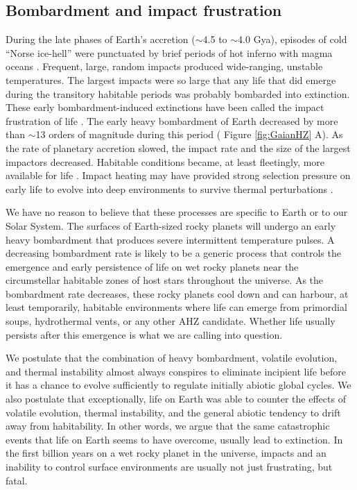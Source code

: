 \subsection{Bombardment and impact frustration}

During the late phases of Earth's accretion ($\sim$4.5 to $\sim$4.0 Gya), episodes of cold ``Norse ice-hell'' were punctuated by
brief periods of hot inferno with magma oceans \citep{Nisbet2002,Elkins-Tanton2008}. 
Frequent, large, random impacts produced wide-ranging, unstable temperatures.
The largest impacts were so large that any life that did emerge during the transitory habitable periods was probably bombarded into extinction.
These early bombardment-induced extinctions have been called the impact frustration of life \citep{Maher1988,Sleep1989,Sleep2014,Davies2005,Marchi2014}.
The early heavy bombardment of Earth decreased by more than $\sim$13 orders of magnitude during this period (\citet{Bland2005,Koberl2006} 
Figure \ref{fig:GaianHZ} A).
As the rate of planetary accretion slowed, the impact rate and the size of the largest impactors decreased.
Habitable conditions became, at least fleetingly, more available for life \citep{Abramov2009,Abramov2013}. Impact heating may have provided strong selection pressure on early life to evolve into deep environments to survive thermal perturbations \citep{Sleep1989,Nisbet2001,Mat2008}.

We have no reason to believe that these processes are specific to Earth or to our Solar System. The surfaces of Earth-sized rocky planets will undergo an early heavy bombardment that produces severe intermittent temperature pulses. A decreasing bombardment rate is likely to be a generic process that controls the emergence and early persistence of life  on wet rocky planets near the circumstellar habitable zones of host stars throughout the universe. As the bombardment rate decreases, these rocky planets cool down and can harbour, at least temporarily, habitable environments where life can emerge from primordial soups, hydrothermal vents, or any other AHZ candidate. 
Whether life usually persists after this emergence is what we are calling into question. 

We postulate that the combination of heavy bombardment, volatile evolution, and thermal instability almost always conspires to eliminate incipient life before it has a chance to evolve sufficiently to regulate initially abiotic global cycles. We also postulate that exceptionally, life on Earth was able to counter the effects of volatile evolution, thermal instability, and the general abiotic tendency to drift away from habitability. In other words, we argue that the same catastrophic events that life on Earth seems to have overcome, usually lead to extinction. In the first billion years on a wet rocky planet in the universe, impacts and an inability to control surface environments are usually not just frustrating, 
but fatal.

